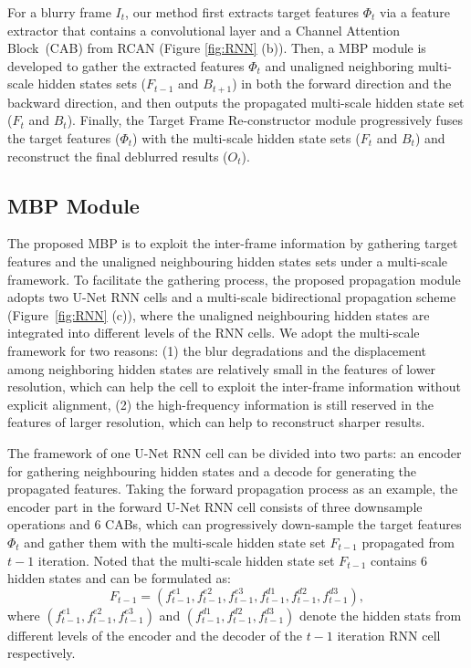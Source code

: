 \documentclass[letterpaper]{article} \usepackage{aaai22}  \usepackage{times}  \usepackage{helvet}  \usepackage{courier}  \usepackage[hyphens]{url}  \usepackage{graphicx} \urlstyle{rm} \def\UrlFont{\rm}  \usepackage{natbib}  \usepackage{caption} \DeclareCaptionStyle{ruled}{labelfont=normalfont,labelsep=colon,strut=off} \frenchspacing  \setlength{\pdfpagewidth}{8.5in}  \setlength{\pdfpageheight}{11in}  \newcommand{\hang}{\textcolor[rgb]{0.98,0.5,0.04}}
\begin{document}
For a blurry frame $I_t$, our method first extracts target features $\Phi_t$ via a feature extractor that contains a convolutional layer and a Channel Attention Block~(CAB) from RCAN \cite{rcan} (Figure \ref{fig:RNN} (b)).
Then, a MBP module is developed to gather the extracted features $\Phi_t$ and unaligned neighboring multi-scale hidden states sets ($F_{t-1}$ and $B_{t+1}$) in both the forward direction and the backward direction, and then outputs the propagated multi-scale hidden state set ($F_{t}$ and $B_{t}$).
Finally, the Target Frame Re-constructor module progressively fuses the target features ($\Phi_t$) with the multi-scale hidden state sets ($F_{t}$ and $B_{t}$) and reconstruct the final deblurred results ($O_t$).


\subsection{MBP Module}
The proposed MBP is to exploit the inter-frame information by gathering target features and the unaligned neighbouring hidden states sets under a multi-scale framework.
To facilitate the gathering process, the proposed propagation module adopts two U-Net RNN cells and a multi-scale bidirectional propagation scheme (Figure~\ref{fig:RNN} (c)), where the unaligned neighbouring hidden states are integrated into different levels of the RNN cells. 
We adopt the multi-scale framework for two reasons:
(1) the blur degradations and the displacement among neighboring hidden states are relatively small in the features of lower resolution, which can help the cell to exploit the inter-frame information without explicit alignment, 
(2) the high-frequency information is still reserved in the features of larger resolution, which can help to reconstruct sharper results. 

The framework of one U-Net RNN cell can be divided into two parts: an encoder for gathering neighbouring hidden states and a decode for generating the propagated features.
Taking the forward propagation process as an example,
the encoder part in the forward U-Net RNN cell consists of three downsample operations and 6 CABs, which can progressively down-sample the target features $\Phi_t$ and gather them with the multi-scale hidden state set $F_{t-1}$ propagated from $t-1$ iteration.
Noted that the multi-scale hidden state set $F_{t-1}$ contains 6 hidden states and can be formulated as:
\begin{equation}\label{eqn:1}
F_{t-1} = (f^{e1}_{t-1}, f^{e2}_{t-1}, f^{e3}_{t-1}, f^{d1}_{t-1}, f^{d2}_{t-1}, f^{d3}_{t-1}),
\end{equation}
where $(f^{e1}_{t-1}, f^{e2}_{t-1}, f^{e3}_{t-1})$ and $(f^{d1}_{t-1}, f^{d2}_{t-1}, f^{d3}_{t-1})$ denote the hidden stats from different levels of the encoder and the decoder of the $t-1$ iteration RNN cell respectively.
\end{document}
